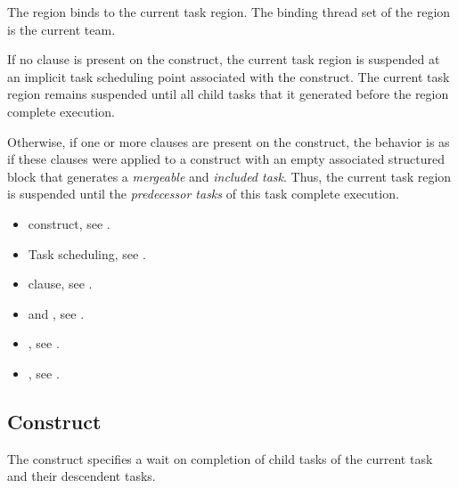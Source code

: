 \binding
The  region binds to the current task region. The binding thread set of the 
 region is the current team.

\descr

If no  clause is present on the  construct, the
current task region is suspended at an implicit task scheduling point
associated with the construct. The current task region remains suspended until
all child tasks that it generated before the  region complete
execution.

Otherwise, if one or more  clauses are present on the
 construct, the behavior is as if these clauses were applied to
a  construct with an empty associated structured block that
generates a \emph{mergeable} and \emph{included task}. Thus, the current task region is
suspended until the \emph{predecessor tasks} of this task complete execution.


\crossreferences
\begin{itemize}
\item {} construct, see .

\item Task scheduling, see 
.

\item {} clause, see .

\item {} and , see
.

\item {}, see
.

\item {}, see
.

\end{itemize}







\subsection{ Construct}
\label{subsec:taskgroup Construct}
\summary
The  construct specifies a wait on completion of child tasks of the current 
task and their descendent tasks.

